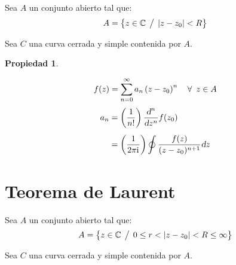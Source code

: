 \documentclass[a5paper,12pt,twoside]{book}
\newtheorem{prop}{{Propiedad}}[chapter]
\begin{document}
Sea $A$ un conjunto abierto tal que:
\begin{equation*}
    A = { \left\{ {z \in \mathbb{C} \hspace{1ex} \big/ \hspace{1ex} {\left| {z-z_0} \right|}<R} \right\} }
\end{equation*}

Sea $C$ una curva cerrada y simple contenida por $A$.

\begin{center}
    \def\svgwidth{0.6\linewidth}
    
\end{center}

\begin{mdframed}[style=MyFrame1]
    \begin{prop}
    \end{prop}
    \begin{equation*}
        f(z) = \sum_{n=0}^\infty a_n \left(z-z_0\right)^n \quad \forall \enspace z \in A
    \end{equation*}
    \begin{align*}
        a_n &= \left( \frac{1}{n!} \right) \frac{\textsl{d}^n}{\textsl{d} z^n} f(z_0)
        \\[1ex]
        &= \left( \frac{1}{2 \pi \mathrm{i}\mkern1mu} \right) \oint \frac{f(z)}{(z-z_0)^{n+1}} \textsl{d} z
    \end{align*}
\end{mdframed}


\section{Teorema de Laurent}
\label{sec:Laurent}

Sea $A$ un conjunto abierto tal que:
\begin{equation*}
    A = { \left\{ {z \in \mathbb{C} \hspace{1ex} \big/ \hspace{1ex} 0 \leq r< {\left| {z-z_0} \right|}<R \leq \infty} \right\} }
\end{equation*}

Sea $C$ una curva cerrada y simple contenida por $A$.

\begin{center}
    \def\svgwidth{0.6\linewidth}
    
\end{center}
\end{document}
